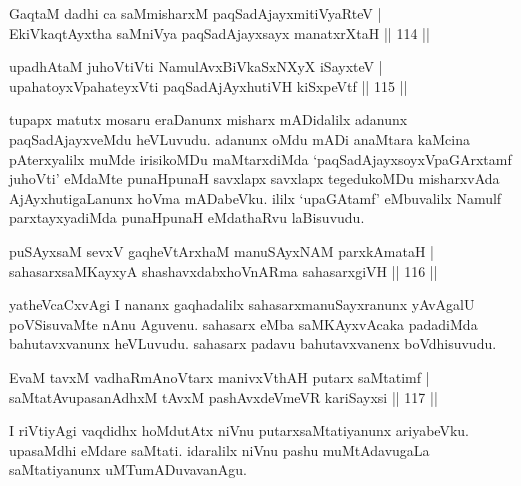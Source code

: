 
\begin{shl}
GaqtaM dadhi ca saMmisharxM paqSadAjayxmitiVyaRteV | \\
EkiVkaqtAyxtha saMniVya paqSadAjayxsayx manatxrXtaH \hfill|| 114 || 
\end{shl}

\begin{shl}
upadhAtaM juhoVtiVti NamulAvx\s \s BiVkaSxNXyX iSayxteV | \\
upahatoyxVpahateyxVti paqSadAjAyxhutiVH kiSxpeVtf \hfill|| 115 || 
\end{shl}

\begin{artha}
tupapx matutx mosaru eraDanunx misharx mADidalilx adanunx 
paqSadAjayxveMdu heVLuvudu. adanunx oMdu mADi anaMtara kaMcina 
pAterxyalilx muMde irisikoMDu maMtarxdiMda `paqSadAjayxsoyxVpaGArxtamf 
juhoVti' eMdaMte punaHpunaH savxlapx savxlapx tegedukoMDu misharxvAda AjAyxhutigaLanunx hoVma mADabeVku. ililx `upaGAtamf' eMbuvalilx Namulf 
parxtayxyadiMda punaHpunaH eMdathaRvu laBisuvudu.
\end{artha}

\begin{shl}
puSAyxsaM sevxV gaqheV\s tArxhaM manuSAyxNAM parxkAmataH | \\
sahasarxsaMKayxyA shashavxdabxhoVnARma sahasarxgiVH \hfill|| 116 || 
\end{shl}

\begin{artha}
yatheVcaCxvAgi I nananx gaqhadalilx sahasarxmanuSayxranunx yAvAgalU 
poVSisuvaMte nAnu Aguvenu. sahasarx eMba saMKAyxvAcaka padadiMda 
bahutavxvanunx heVLuvudu. sahasarx padavu bahutavxvanenx boVdhisuvudu.
\end{artha}

\begin{shl}
EvaM tavxM vadhaRmAnoV\s tarx manivxVthAH putarx saMtatimf | \\
saMtatAvupasanAdhxM tAvxM pashAvxdeVmeVR kariSayxsi \hfill|| 117 || 
\end{shl}

\begin{artha}
I riVtiyAgi vaqdidhx hoMdutAtx niVnu putarxsaMtatiyanunx ariyabeVku. 
upasaMdhi eMdare saMtati. idaralilx niVnu pashu muMtAdavugaLa 
saMtatiyanunx uMTumADuvavanAgu.
\end{artha}


